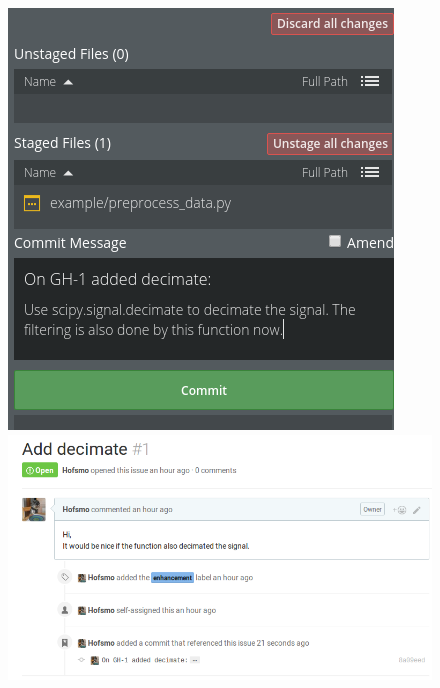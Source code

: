 \begin{frame}
\begin{columns}
\begin{column}{0.6\textwidth}
\begin{figure}
\begin{overprint}
					\includegraphics[width=\textwidth]{./pictures/commit_decimate.png}
					\onslide<4>\includegraphics[width=\textwidth]{./pictures/decimate_ref.png}
				\end{overprint}
			\end{figure}
		\end{column}
	\end{columns}
\end{frame}
